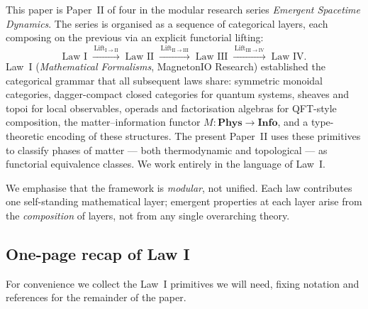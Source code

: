 \documentclass[12pt]{article}
\theoremstyle{plain}
\theoremstyle{definition}
\theoremstyle{remark}
\newcommand{\Phys}{\mathbf{Phys}}
\newcommand{\Info}{\mathbf{Info}}
\begin{document}
This paper is Paper~II of four in the modular research series \emph{Emergent Spacetime
Dynamics}. The series is organised as a sequence of categorical layers, each composing
on the previous via an explicit functorial lifting:
\[
\text{Law I} \;\xrightarrow{\,\mathrm{Lift}_{\mathrm{I}\to\mathrm{II}}\,}\;
\text{Law II} \;\xrightarrow{\,\mathrm{Lift}_{\mathrm{II}\to\mathrm{III}}\,}\;
\text{Law III} \;\xrightarrow{\,\mathrm{Lift}_{\mathrm{III}\to\mathrm{IV}}\,}\;
\text{Law IV.}
\]
Law~I (\emph{Mathematical Formalisms}, MagnetonIO Research) established the categorical
grammar that all subsequent laws share: symmetric monoidal categories, dagger-compact
closed categories for quantum systems, sheaves and topoi for local observables, operads
and factorisation algebras for QFT-style composition, the matter--information functor
$M:\Phys\to\Info$, and a type-theoretic encoding of these structures.
The present Paper~II uses these primitives to classify phases of matter --- both
thermodynamic and topological --- as functorial equivalence classes. We work entirely
in the language of Law~I.

We emphasise that the framework is \emph{modular}, not unified. Each law contributes one
self-standing mathematical layer; emergent properties at each layer arise from the
\emph{composition} of layers, not from any single overarching theory.

\subsection{One-page recap of Law I}
\label{sec:lawI-recap}

For convenience we collect the Law~I primitives we will need, fixing notation and
references for the remainder of the paper.
\end{document}
